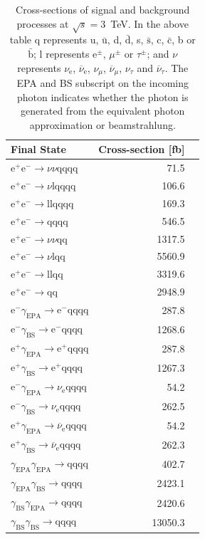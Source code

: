 \begin{table}[h!]
\centering
\begin{tabular}{ l r r }
\hline
Final State & Cross-section [fb]  \\ 
\hline
$\text{e}^{+}\text{e}^{-} \rightarrow \nu{\nu}\text{qqqq}$ & 71.5 \\
$\text{e}^{+}\text{e}^{-} \rightarrow \nu\text{lqqqq}$ & 106.6 \\
$\text{e}^{+}\text{e}^{-} \rightarrow \text{llqqqq}$ & 169.3 \\
$\text{e}^{+}\text{e}^{-} \rightarrow \text{qqqq}$ & 546.5 \\
$\text{e}^{+}\text{e}^{-} \rightarrow \nu{\nu}\text{qq}$ & 1317.5 \\
$\text{e}^{+}\text{e}^{-} \rightarrow \nu\text{lqq}$ & 5560.9 \\
$\text{e}^{+}\text{e}^{-} \rightarrow \text{llqq}$ & 3319.6 \\
$\text{e}^{+}\text{e}^{-} \rightarrow \text{qq}$ & 2948.9 \\
$\text{e}^{-}\gamma_{\text{EPA}} \rightarrow \text{e}^{-}\text{qqqq}$ & 287.8 \\
$\text{e}^{-}\gamma_{\text{BS}} \rightarrow \text{e}^{-}\text{qqqq}$ & 1268.6 \\
$\text{e}^{+}\gamma_{\text{EPA}} \rightarrow \text{e}^{+}\text{qqqq}$ & 287.8 \\
$\text{e}^{+}\gamma_{\text{BS}} \rightarrow \text{e}^{+}\text{qqqq}$ & 1267.3 \\
$\text{e}^{-}\gamma_{\text{EPA}} \rightarrow \nu_{\text{e}}\text{qqqq}$ & 54.2 \\
$\text{e}^{-}\gamma_{\text{BS}} \rightarrow \nu_{\text{e}}\text{qqqq}$ & 262.5 \\
$\text{e}^{+}\gamma_{\text{EPA}} \rightarrow \overline{\nu}_{\text{e}}\text{qqqq}$ & 54.2 \\
$\text{e}^{+}\gamma_{\text{BS}} \rightarrow \overline{\nu}_{\text{e}}\text{qqqq}$ & 262.3 \\
$\gamma_{\text{EPA}}\gamma_{\text{EPA}} \rightarrow \text{qqqq}$ & 402.7 \\
$\gamma_{\text{EPA}}\gamma_{\text{BS}} \rightarrow \text{qqqq}$ & 2423.1 \\
$\gamma_{\text{BS}}\gamma_{\text{EPA}} \rightarrow \text{qqqq}$ & 2420.6 \\
$\gamma_{\text{BS}}\gamma_{\text{BS}} \rightarrow \text{qqqq}$ & 13050.3 \\
\hline
\end{tabular}
\caption[Cross-sections of signal and background processes at $\sqrt{s}=3$~TeV]{Cross-sections of signal and background processes at $\sqrt{s}=3$~TeV.  In the above table q represents u, $\bar{\text{u}}$, d, $\bar{\text{d}}$, s, $\bar{\text{s}}$, c, $\bar{\text{c}}$, b or $\bar{\text{b}}$;  l represents $\text{e}^{\pm}$, $\mu^{\pm}$ or $\tau^{\pm}$; and $\nu$ represents $\nu_{\text{e}}$, $\overline{\nu}_{\text{e}}$, $\nu_{\mu}$, $\overline{\nu}_{\mu}$, $\nu_{\tau}$ and $\overline{\nu}_{\tau}$.  The EPA and BS subscript on the incoming photon indicates whether the photon is generated from the equivalent photon approximation or beamstrahlung.}
\label{table:crosssection3000GeV}
\end{table}

